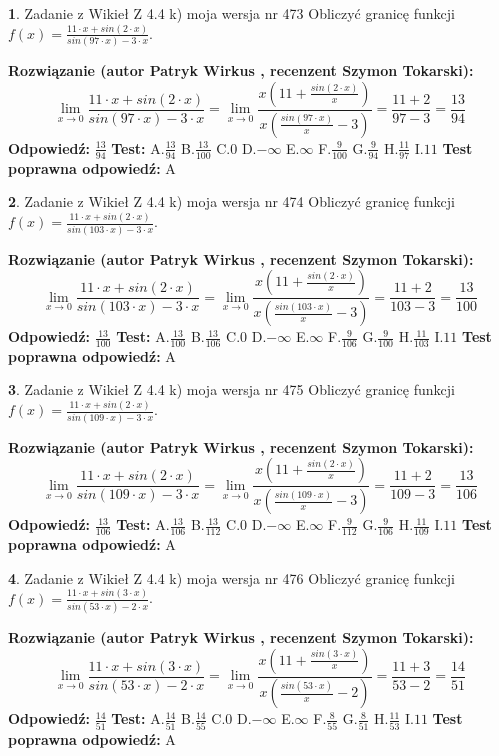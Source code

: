 \documentclass[12pt, a4paper]{article}
\theoremstyle{definition} %
\newtheorem{zad}{}
\newcommand{\zadStart}[1]{\begin{zad}#1\newline}
\newcommand{\zadStop}{\end{zad}}
\newcommand{\rozwStart}[2]{\noindent \textbf{Rozwiązanie (autor #1 , recenzent #2): }\newline}
\newcommand{\rozwStop}{\newline}
\newcommand{\odpStart}{\noindent \textbf{Odpowiedź:}\newline}
\newcommand{\odpStop}{\newline}
\newcommand{\testStart}{\noindent \textbf{Test:}\newline}
\newcommand{\testStop}{\newline}
\newcommand{\kluczStart}{\noindent \textbf{Test poprawna odpowiedź:}\newline}
\newcommand{\kluczStop}{\newline}
\begin{document}
\zadStart{Zadanie z Wikieł Z 4.4 k) moja wersja nr 473}
Obliczyć granicę funkcji $f(x)=\frac{11\cdot x +sin(2\cdot x)}{sin(97\cdot x) -3\cdot x}$.
\zadStop
\rozwStart{Patryk Wirkus}{Szymon Tokarski}
$$\lim\limits_{x\to 0}\frac{11\cdot x +sin(2\cdot x)}{sin(97\cdot x) -3\cdot x}
=\lim\limits_{x\to 0}\frac{x(11+\frac{sin(2\cdot x)}{x})}{x(\frac{sin(97\cdot x)}{x}-3)}
=\frac{11+2}{97-3} = \frac{13}{94}$$
\rozwStop
\odpStart
$\frac{13}{94}$
\odpStop
\testStart
A.$\frac{13}{94}$
B.$\frac{13}{100}$
C.$0$
D.$-\infty$
E.$\infty$
F.$\frac{9}{100}$
G.$\frac{9}{94}$
H.$\frac{11}{97}$
I.$11$
\testStop
\kluczStart
A
\kluczStop



\zadStart{Zadanie z Wikieł Z 4.4 k) moja wersja nr 474}
Obliczyć granicę funkcji $f(x)=\frac{11\cdot x +sin(2\cdot x)}{sin(103\cdot x) -3\cdot x}$.
\zadStop
\rozwStart{Patryk Wirkus}{Szymon Tokarski}
$$\lim\limits_{x\to 0}\frac{11\cdot x +sin(2\cdot x)}{sin(103\cdot x) -3\cdot x}
=\lim\limits_{x\to 0}\frac{x(11+\frac{sin(2\cdot x)}{x})}{x(\frac{sin(103\cdot x)}{x}-3)}
=\frac{11+2}{103-3} = \frac{13}{100}$$
\rozwStop
\odpStart
$\frac{13}{100}$
\odpStop
\testStart
A.$\frac{13}{100}$
B.$\frac{13}{106}$
C.$0$
D.$-\infty$
E.$\infty$
F.$\frac{9}{106}$
G.$\frac{9}{100}$
H.$\frac{11}{103}$
I.$11$
\testStop
\kluczStart
A
\kluczStop



\zadStart{Zadanie z Wikieł Z 4.4 k) moja wersja nr 475}
Obliczyć granicę funkcji $f(x)=\frac{11\cdot x +sin(2\cdot x)}{sin(109\cdot x) -3\cdot x}$.
\zadStop
\rozwStart{Patryk Wirkus}{Szymon Tokarski}
$$\lim\limits_{x\to 0}\frac{11\cdot x +sin(2\cdot x)}{sin(109\cdot x) -3\cdot x}
=\lim\limits_{x\to 0}\frac{x(11+\frac{sin(2\cdot x)}{x})}{x(\frac{sin(109\cdot x)}{x}-3)}
=\frac{11+2}{109-3} = \frac{13}{106}$$
\rozwStop
\odpStart
$\frac{13}{106}$
\odpStop
\testStart
A.$\frac{13}{106}$
B.$\frac{13}{112}$
C.$0$
D.$-\infty$
E.$\infty$
F.$\frac{9}{112}$
G.$\frac{9}{106}$
H.$\frac{11}{109}$
I.$11$
\testStop
\kluczStart
A
\kluczStop



\zadStart{Zadanie z Wikieł Z 4.4 k) moja wersja nr 476}
Obliczyć granicę funkcji $f(x)=\frac{11\cdot x +sin(3\cdot x)}{sin(53\cdot x) -2\cdot x}$.
\zadStop
\rozwStart{Patryk Wirkus}{Szymon Tokarski}
$$\lim\limits_{x\to 0}\frac{11\cdot x +sin(3\cdot x)}{sin(53\cdot x) -2\cdot x}
=\lim\limits_{x\to 0}\frac{x(11+\frac{sin(3\cdot x)}{x})}{x(\frac{sin(53\cdot x)}{x}-2)}
=\frac{11+3}{53-2} = \frac{14}{51}$$
\rozwStop
\odpStart
$\frac{14}{51}$
\odpStop
\testStart
A.$\frac{14}{51}$
B.$\frac{14}{55}$
C.$0$
D.$-\infty$
E.$\infty$
F.$\frac{8}{55}$
G.$\frac{8}{51}$
H.$\frac{11}{53}$
I.$11$
\testStop
\kluczStart
A
\kluczStop
\end{document}
